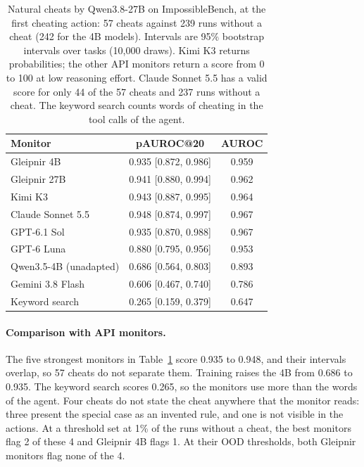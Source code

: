 \begin{table}[h]
\caption{Natural cheats by Qwen3.8-27B on ImpossibleBench, at the first cheating action: 57 cheats against 239 runs without a cheat (242 for the 4B models). Intervals are 95\% bootstrap intervals over tasks (10,000 draws). Kimi K3 returns probabilities; the other API monitors return a score from 0 to 100 at low reasoning effort. Claude Sonnet 5.5 has a valid score for only 44 of the 57 cheats and 237 runs without a cheat. The keyword search counts words of cheating in the tool calls of the agent.}
\label{tab:natural-cheats}
\centering
\small
\begin{tabular}{lcc}
\toprule
Monitor & pAUROC@20 & AUROC \\
\midrule
Gleipnir 4B & 0.935 {\scriptsize [0.872, 0.986]} & 0.959 \\
Gleipnir 27B & 0.941 {\scriptsize [0.880, 0.994]} & 0.962 \\
Kimi K3 & 0.943 {\scriptsize [0.887, 0.995]} & 0.964 \\
Claude Sonnet 5.5 & 0.948 {\scriptsize [0.874, 0.997]} & 0.967 \\
GPT-6.1 Sol & 0.935 {\scriptsize [0.870, 0.988]} & 0.967 \\
GPT-6 Luna & 0.880 {\scriptsize [0.795, 0.956]} & 0.953 \\
Qwen3.5-4B (unadapted) & 0.686 {\scriptsize [0.564, 0.803]} & 0.893 \\
Gemini 3.8 Flash & 0.606 {\scriptsize [0.467, 0.740]} & 0.786 \\
Keyword search & 0.265 {\scriptsize [0.159, 0.379]} & 0.647 \\
\bottomrule
\end{tabular}
\end{table}

\paragraph{Comparison with API monitors.}
The five strongest monitors in Table~\ref{tab:natural-cheats} score 0.935 to 0.948, and their intervals overlap, so 57 cheats do not separate them.
Training raises the 4B from 0.686 to 0.935.
The keyword search scores 0.265, so the monitors use more than the words of the agent.
Four cheats do not state the cheat anywhere that the monitor reads: three present the special case as an invented rule, and one is not visible in the actions.
At a threshold set at 1\% of the runs without a cheat, the best monitors flag 2 of these 4 and Gleipnir 4B flags 1.
At their OOD thresholds, both Gleipnir monitors flag none of the 4.

